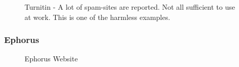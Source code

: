  \begin{figure}[!h]
  \centering
  \caption{Turnitin - A lot of spam-sites are reported. Not all sufficient to use at work. This is one of the harmless examples.}
  \label{fig:Turnitin overview}
\end{figure}






\newpage

\subsubsection{Ephorus}

 \begin{figure}[!h]
  \centering
  \caption{Ephorus Website}
  \label{fig:plagawareWebsite}
\end{figure}

